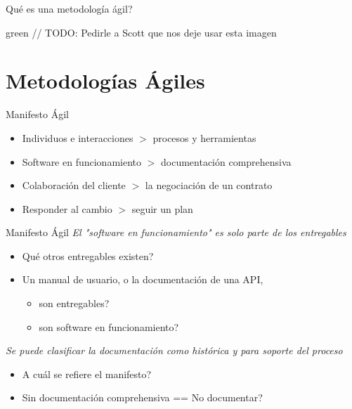 \documentclass{beamer}
\begin{document}
\begin{frame}{\textquestiondown Qu\'e es una metodolog\'ia \'agil?}
\begin{center}
\end{center}
\begin{flushright}\begin{color}{green}
  // TODO: Pedirle a Scott que nos deje usar esta imagen
\end{color}\end{flushright}
\end{frame}



\section{Metodolog\'ias \'Agiles}

\begin{frame}{Manifesto \'Agil}
\begin{itemize}
  \item Individuos e interacciones $>$ procesos y herramientas
  \item Software en funcionamiento $>$ documentaci\'on comprehensiva
  \item Colaboraci\'on del cliente $>$ la negociaci\'on de un contrato
  \item Responder al cambio $>$ seguir un plan
\end{itemize}
\begin{flushright}
\end{flushright}
\end{frame}

\begin{frame}{Manifesto \'Agil}
\textit{El "software en funcionamiento" es solo parte de los entregables}
\begin{itemize}
  \item \textquestiondown Qu\'e otros entregables existen?
  \item Un manual de usuario, o la documentaci\'on de una API, \\
        \begin{itemize}
                \item \textquestiondown son entregables?
                \item \textquestiondown son software en funcionamiento?
        \end{itemize}
\end{itemize}
\textit{Se puede clasificar la documentaci\'on como hist\'orica y para soporte del proceso}
\begin{itemize}
  \item \textquestiondown A cu\'al se refiere el manifesto?
  \item \textquestiondown Sin documentaci\'on comprehensiva == No documentar?
\end{itemize}
\end{frame}
\end{document}
